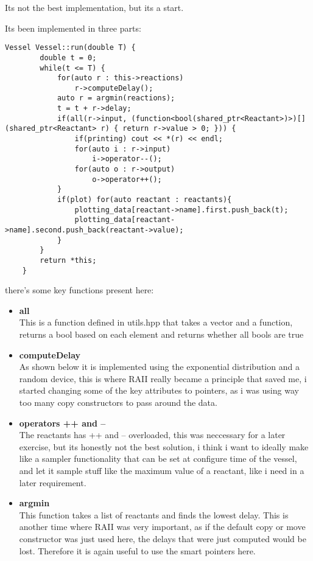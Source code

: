 Its not the best implementation, but its a start.


Its been implemented in three parts:

\begin{lstlisting}[caption=algorithm implementation, style=colorC++]
    Vessel Vessel::run(double T) {
        double t = 0;
        while(t <= T) {
            for(auto r : this->reactions)
                r->computeDelay();
            auto r = argmin(reactions);
            t = t + r->delay;
            if(all(r->input, (function<bool(shared_ptr<Reactant>)>)[](shared_ptr<Reactant> r) { return r->value > 0; })) {
                if(printing) cout << *(r) << endl;
                for(auto i : r->input)
                    i->operator--();
                for(auto o : r->output)
                    o->operator++();
            }
            if(plot) for(auto reactant : reactants){
                plotting_data[reactant->name].first.push_back(t);
                plotting_data[reactant->name].second.push_back(reactant->value);
            }
        }
        return *this;
    }
\end{lstlisting}

there's some key functions present here:
\begin{itemize}
    \item{
        \textbf{all}\\
        This is a function defined in utils.hpp that takes a vector and a function, returns a bool based on each element and returns whether all bools are true
    }
    \item{
        \textbf{computeDelay}\\
        As shown below it is implemented using the exponential distribution and a random device, this is where RAII really became a principle that saved me, i started changing some of the key attributes to pointers, as i was using way too many copy constructors to pass around the data.
    }
    \item{
        \textbf{operators ++ and --}\\
        The reactants has ++ and -- overloaded, this was neccessary for a later exercise, but its honestly not the best solution, i think i want to ideally make like a sampler functionality that can be set at configure time of the vessel, and let it sample stuff like the maximum value of a reactant, like i need in a later requirement.
    }
    \item{
        \textbf{argmin}\\
        This function takes a list of reactants and finds the lowest delay. This is another time where RAII was very important, as if the default copy or move constructor was just used here, the delays that were just computed would be lost. Therefore it is again useful to use the smart pointers here.
    }
\end{itemize}

